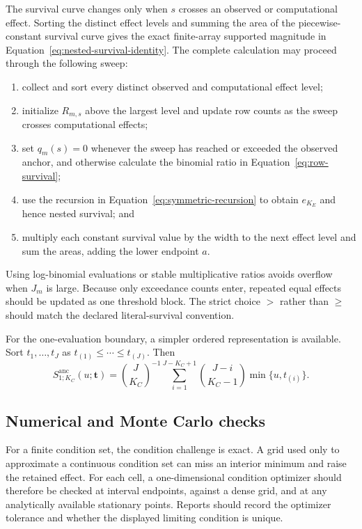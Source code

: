 \documentclass[11pt]{article}
\newcommand{\Sanc}{S^{\mathrm{anc}}}
\theoremstyle{remark}
\begin{document}
The survival curve changes only when $s$ crosses an observed or computational
effect. Sorting the distinct effect levels and summing the area of the
piecewise-constant survival curve gives the exact finite-array supported
magnitude in Equation~\eqref{eq:nested-survival-identity}. The complete
calculation may proceed through the following sweep:
\begin{enumerate}
\item collect and sort every distinct observed and computational effect level;
\item initialize $R_{m,s}$ above the largest level and update row counts as the
sweep crosses computational effects;
\item set $q_m(s)=0$ whenever the sweep has reached or exceeded the observed
anchor, and otherwise calculate the binomial ratio in
Equation~\eqref{eq:row-survival};
\item use the recursion in Equation~\eqref{eq:symmetric-recursion} to obtain
$e_{K_E}$ and hence nested survival; and
\item multiply each constant survival value by the width to the next effect
level and sum the areas, adding the lower endpoint $a$.
\end{enumerate}
Using log-binomial evaluations or stable multiplicative ratios avoids overflow
when $J_m$ is large. Because only exceedance counts enter, repeated equal
effects should be updated as one threshold block. The strict choice $>$ rather
than $\geq$ should match the declared literal-survival convention.

For the one-evaluation boundary, a simpler ordered representation is available.
Sort $t_1,\ldots,t_J$ as $t_{(1)}\leq\cdots\leq t_{(J)}$. Then
\begin{equation}
\Sanc_{1;K_C}(u;\mathbf t)
=
\binom{J}{K_C}^{-1}
\sum_{i=1}^{J-K_C+1}
\binom{J-i}{K_C-1}
\min\{u,t_{(i)}\}.
\label{eq:one-row-sorted}
\end{equation}

\subsection{Numerical and Monte Carlo checks}

For a finite condition set, the condition challenge is exact. A grid used only
to approximate a continuous condition set can miss an interior minimum and
raise the retained effect. For each cell, a one-dimensional condition optimizer
should therefore be checked at interval endpoints, against a dense grid, and
at any analytically available stationary points. Reports should record the
optimizer tolerance and whether the displayed limiting condition is unique.
\end{document}
